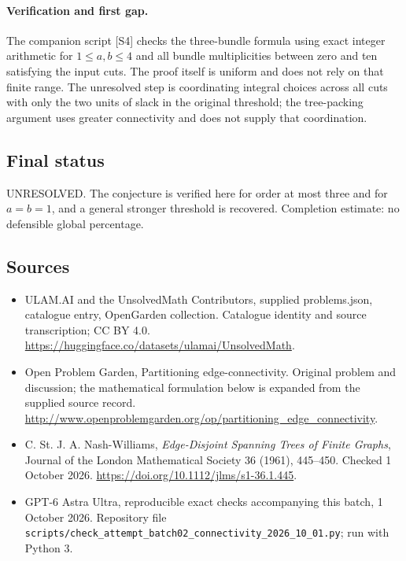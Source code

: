 \documentclass[11pt,a4paper]{article}
\begin{document}
\paragraph{Verification and first gap.}
The companion script [S4] checks the three-bundle formula using exact
integer arithmetic for $1\le a,b\le4$ and all bundle multiplicities
between zero and ten satisfying the input cuts. The proof itself is
uniform and does not rely on that finite range. The unresolved step
is coordinating integral choices across all cuts with only the two
units of slack in the original threshold; the tree-packing argument
uses greater connectivity and does not supply that coordination.

\subsection{Final status}
UNRESOLVED. The conjecture is verified here for order at most three
and for $a=b=1$, and a general stronger threshold is recovered.
Completion estimate: no defensible global percentage.

\subsection{Sources}
\begin{itemize}
\item[S1] ULAM.AI and the UnsolvedMath Contributors, supplied problems.json, catalogue entry, OpenGarden collection. Catalogue identity and source transcription; CC BY 4.0.
\url{https://huggingface.co/datasets/ulamai/UnsolvedMath}.
\item[S2] Open Problem Garden, Partitioning edge-connectivity. Original problem and discussion; the mathematical formulation below is expanded from the supplied source record.
\url{http://www.openproblemgarden.org/op/partitioning_edge_connectivity}.
\item[S3] C. St. J. A. Nash-Williams, \emph{Edge-Disjoint Spanning Trees of Finite Graphs}, Journal of the London Mathematical Society 36 (1961), 445--450. Checked 1 October 2026.
\url{https://doi.org/10.1112/jlms/s1-36.1.445}.
\item[S4] GPT-6 Astra Ultra, reproducible exact checks accompanying this batch, 1 October 2026. Repository file \texttt{scripts/check\_attempt\_batch02\_connectivity\_2026\_10\_01.py}; run with Python 3.
\end{itemize}
\end{document}
